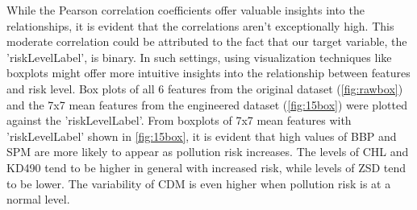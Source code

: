 \documentclass[a4paper,11pt]{report}
\begin{document}
While the Pearson correlation coefficients offer valuable insights into the relationships, it is evident that the correlations aren't exceptionally high. This moderate correlation could be attributed to the fact that our target variable, the 'riskLevelLabel', is binary. In such settings, using visualization techniques like boxplots might offer more intuitive insights into the relationship between features and risk level. Box plots of all 6 features from the original dataset (\ref{fig:rawbox}) and the 7x7 mean features from the engineered dataset (\ref{fig:15box}) were plotted against the 'riskLevelLabel'. From boxplots of 7x7 mean features with 'riskLevelLabel' shown in \ref{fig:15box}, it is evident that high values of BBP and SPM are more likely to appear as pollution risk increases. The levels of CHL and KD490 tend to be higher in general with increased risk, while levels of ZSD tend to be lower. The variability of CDM is even higher when pollution risk is at a normal level.
\end{document}
